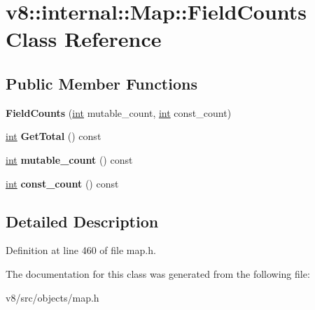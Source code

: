 \hypertarget{classv8_1_1internal_1_1Map_1_1FieldCounts}{}\section{v8\+:\+:internal\+:\+:Map\+:\+:Field\+Counts Class Reference}
\label{classv8_1_1internal_1_1Map_1_1FieldCounts}
\subsection*{Public Member Functions}
\begin{DoxyCompactItemize}
\item 
\mbox{\label{classv8_1_1internal_1_1Map_1_1FieldCounts_a3f6fe4ef32cd7d04989b2ced6e8538f6}} 
{\bfseries Field\+Counts} (\mbox{\hyperlink{classint}{int}} mutable\+\_\+count, \mbox{\hyperlink{classint}{int}} const\+\_\+count)
\item 
\mbox{\label{classv8_1_1internal_1_1Map_1_1FieldCounts_a2cc95436cf438af1d48bb78a8535da71}} 
\mbox{\hyperlink{classint}{int}} {\bfseries Get\+Total} () const
\item 
\mbox{\label{classv8_1_1internal_1_1Map_1_1FieldCounts_a3e3390160e29ac512778c0019e8ccc2b}} 
\mbox{\hyperlink{classint}{int}} {\bfseries mutable\+\_\+count} () const
\item 
\mbox{\label{classv8_1_1internal_1_1Map_1_1FieldCounts_abc5e3ffec31848dc3c12c5490047586a}} 
\mbox{\hyperlink{classint}{int}} {\bfseries const\+\_\+count} () const
\end{DoxyCompactItemize}


\subsection{Detailed Description}


Definition at line 460 of file map.\+h.



The documentation for this class was generated from the following file\+:\begin{DoxyCompactItemize}
\item 
v8/src/objects/map.\+h\end{DoxyCompactItemize}
